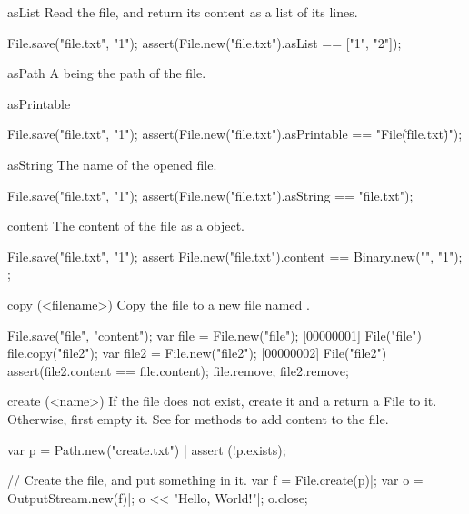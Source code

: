 \begin{urbiscriptapi}
\item[asList]
  Read the file, and return its content as a list of its lines.
\begin{urbiscript}
File.save("file.txt", "1\n");
assert(File.new("file.txt").asList == ["1", "2"]);
\end{urbiscript}

\item[asPath] A  being the path of the file.

\item[asPrintable]
\begin{urbiscript}
File.save("file.txt", "1\n");
assert(File.new("file.txt").asPrintable == "File(\"file.txt\")");
\end{urbiscript}

\item[asString]
  The name of the opened file.
\begin{urbiscript}
File.save("file.txt", "1\n");
assert(File.new("file.txt").asString == "file.txt");
\end{urbiscript}

\item[content]
  The content of the file as a  object.
\begin{urbiscript}
File.save("file.txt", "1\n");
assert
{
  File.new("file.txt").content == Binary.new("", "1\n");
};
\end{urbiscript}

\item[copy](<filename>)
  Copy the file to a new file named .
\begin{urbiscript}
File.save("file", "content");
var file = File.new("file");
[00000001] File("file")
file.copy("file2");
var file2 = File.new("file2");
[00000002] File("file2")
assert(file2.content == file.content);
file.remove;
file2.remove;
\end{urbiscript}

\item[create](<name>)%
  If the file  does not exist, create it and a return a File to
  it.  Otherwise, first empty it.  See  for methods
  to add content to the file.
\begin{urbiscript}
var p = Path.new("create.txt") |
assert (!p.exists);

// Create the file, and put something in it.
var f = File.create(p)|;
var o = OutputStream.new(f)|;
o << "Hello, World!"|;
o.close;


\end{urbiscript}
\end{urbiscriptapi}

